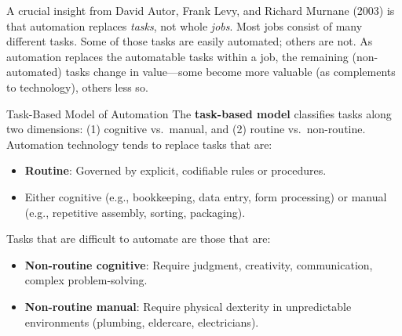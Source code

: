 A crucial insight from David Autor, Frank Levy, and Richard Murnane (2003) is that automation replaces \textit{tasks}, not whole \textit{jobs}. Most jobs consist of many different tasks. Some of those tasks are easily automated; others are not. As automation replaces the automatable tasks within a job, the remaining (non-automated) tasks change in value---some become more valuable (as complements to technology), others less so.

\begin{defbox}{Task-Based Model of Automation}
The \textbf{task-based model} classifies tasks along two dimensions: (1) cognitive vs.\ manual, and (2) routine vs.\ non-routine. Automation technology tends to replace tasks that are:
\begin{itemize}
  \item \textbf{Routine}: Governed by explicit, codifiable rules or procedures.
  \item Either cognitive (e.g., bookkeeping, data entry, form processing) or manual (e.g., repetitive assembly, sorting, packaging).
\end{itemize}
Tasks that are difficult to automate are those that are:
\begin{itemize}
  \item \textbf{Non-routine cognitive}: Require judgment, creativity, communication, complex problem-solving.
  \item \textbf{Non-routine manual}: Require physical dexterity in unpredictable environments (plumbing, eldercare, electricians).
\end{itemize}
\end{defbox}

